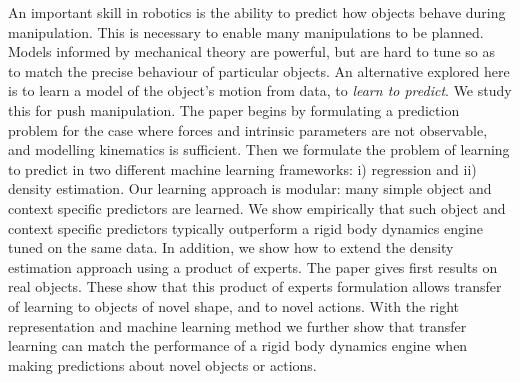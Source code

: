 An important skill in robotics is the ability to predict how objects behave during manipulation.  This is necessary to enable many manipulations to be planned. Models informed by mechanical theory are powerful, but are hard to tune so as to match the precise behaviour of particular objects.  An alternative explored here is to learn a model of the object's motion from data, to {\em learn to predict}. We study this for push manipulation. The paper begins by formulating a prediction problem for the case where forces and intrinsic parameters are not observable, and modelling kinematics is sufficient. Then we formulate the problem of learning to predict in two different machine learning frameworks: i) regression and ii) density estimation. Our learning approach is modular: many simple object and context specific predictors are learned. We show empirically that such object and context specific predictors typically outperform a rigid body dynamics engine tuned on the same data.  In addition, we show how to extend the density estimation approach using a product of experts. The paper gives first results on real objects. These show that this product of experts formulation allows transfer of learning to objects of novel shape, and to novel actions. With the right representation and machine learning method we further show that transfer learning can match the performance of a rigid body dynamics engine when making predictions about novel objects or actions.
